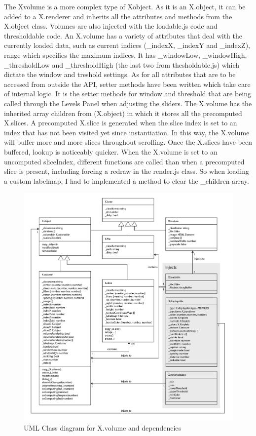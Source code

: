 \documentclass[a4paper,11pt,titlepage]{article}
\begin{document}
The Xvolume is a more complex type of Xobject. As it is an X.object, it can be added to a X.renderer and inherits all the attributes and methods from the X.object class. Volumes are also injected with the loadable.js code and thresholdable code. An X.volume has a variety of attributes that deal with the currently loaded data, such as current indices (\_indexX, \_indexY and \_indexZ), range which specifies the maximum indices. It has \_windowLow, \_windowHigh, \_thresholdLow and \_thresholdHigh (the last two from thesholdable.js) which dictate the window and treshold settings. As for all attributes that are to be accessed from outside the API, setter methods have been written which take care of internal logic. It is the setter methods for window and threshold that are being called through the Levels Panel when adjusting the sliders. The X.volume has the inherited array children from (X.object) in which it stores all the precomputed X.slices. A precomputed X.slice is generated when the slice index is set to an index that has not been visited yet since instantiation. In this way, the X.volume will buffer more and more slices throughout scrolling. Once the X.slices have been buffered, lookup is noticeably quicker. When the X.volume is set to an uncomputed sliceIndex, different functions are called than when a precomputed slice is present, including forcing a redraw in the render.js class. So when loading a custom labelmap, I had to implemented a method to clear the \_children array.

\begin{figure}[ht!]
\centering
\includegraphics[width=170mm]{graphics/xtkUML_04.png}
\caption{UML Class diagram for X.volume and dependencies}
\label{fig:UIdesign1}
\end{figure}
\end{document}
